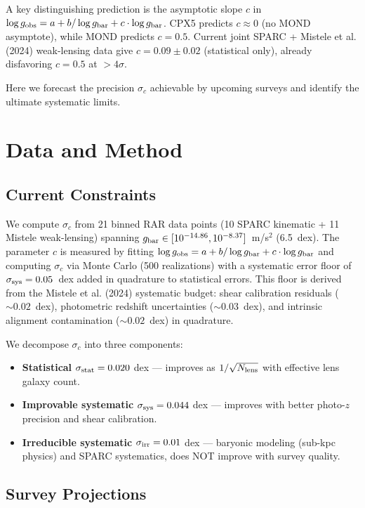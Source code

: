 \documentclass[twocolumn]{aastex631}
\begin{document}
A key distinguishing prediction is the asymptotic slope $c$ in
$\log g_{\rm obs} = a + b/\log g_{\rm bar} + c\cdot\log g_{\rm bar}$.
CPX5 predicts $c \approx 0$ (no MOND asymptote), while MOND predicts
$c = 0.5$.  Current joint SPARC + Mistele et al. (2024) weak-lensing
data give $c = 0.09 \pm 0.02$ (statistical only), already disfavoring
$c = 0.5$ at $>4\sigma$.

Here we forecast the precision $\sigma_c$ achievable by upcoming surveys
and identify the ultimate systematic limits.

\section{Data and Method}

\subsection{Current Constraints}

We compute $\sigma_c$ from 21 binned RAR data points (10 SPARC kinematic
+ 11 Mistele weak-lensing) spanning $g_{\rm bar} \in [10^{-14.86},
10^{-8.37}]$~m/s$^2$ (6.5~dex).  The parameter $c$ is measured by fitting
$\log g_{\rm obs} = a + b/\log g_{\rm bar} + c\cdot\log g_{\rm bar}$ and
computing $\sigma_c$ via Monte Carlo (500 realizations) with a systematic
error floor of $\sigma_{\rm sys} = 0.05$~dex added in quadrature to
statistical errors.  This floor is derived from the Mistele et al. (2024)
systematic budget: shear calibration residuals ($\sim0.02$~dex),
photometric redshift uncertainties ($\sim0.03$~dex), and intrinsic
alignment contamination ($\sim0.02$~dex) in quadrature.

We decompose $\sigma_c$ into three components:
\begin{itemize}
\item \textbf{Statistical} $\sigma_{\rm stat} = 0.020$ dex --- improves
      as $1/\sqrt{N_{\rm lens}}$ with effective lens galaxy count.
\item \textbf{Improvable systematic} $\sigma_{\rm sys} = 0.044$ dex ---
      improves with better photo-$z$ precision and shear calibration.
\item \textbf{Irreducible systematic} $\sigma_{\rm irr} = 0.01$ dex ---
      baryonic modeling (sub-kpc physics) and SPARC systematics, does
      NOT improve with survey quality.
\end{itemize}

\subsection{Survey Projections}
\end{document}
